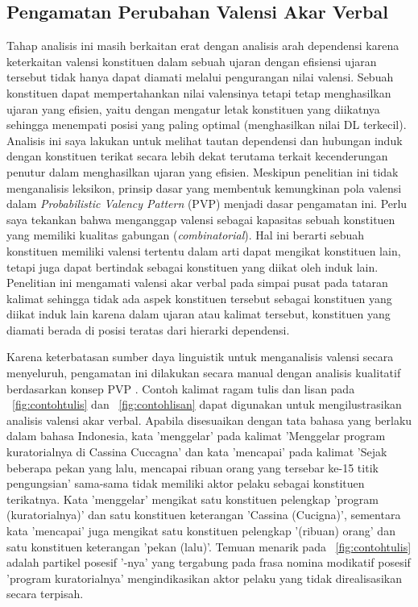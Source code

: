 \subsection{Pengamatan Perubahan Valensi Akar Verbal}
Tahap analisis ini masih berkaitan erat dengan analisis arah dependensi karena keterkaitan valensi konstituen dalam sebuah ujaran dengan efisiensi ujaran tersebut tidak hanya dapat diamati melalui pengurangan nilai valensi. Sebuah konstituen dapat mempertahankan nilai valensinya tetapi tetap menghasilkan ujaran yang efisien, yaitu dengan mengatur letak konstituen yang diikatnya sehingga menempati posisi yang paling optimal (menghasilkan nilai DL terkecil). Analisis ini saya lakukan untuk melihat tautan dependensi dan hubungan induk dengan konstituen terikat secara lebih dekat terutama terkait kecenderungan penutur dalam menghasilkan ujaran yang efisien. Meskipun penelitian ini tidak menganalisis leksikon, prinsip dasar yang membentuk kemungkinan pola valensi dalam \textit{Probabilistic Valency Pattern} (PVP) \citep{liu2006syntactic} menjadi dasar pengamatan ini. Perlu saya tekankan bahwa \cite{liu2006syntactic} menganggap valensi sebagai kapasitas sebuah konstituen yang memiliki kualitas gabungan (\textit{combinatorial}). Hal ini berarti sebuah konstituen memiliki valensi tertentu dalam arti dapat mengikat konstituen lain, tetapi juga dapat bertindak sebagai konstituen yang diikat oleh induk lain. Penelitian ini mengamati valensi akar verbal pada simpai pusat pada tataran kalimat sehingga tidak ada aspek konstituen tersebut sebagai konstituen yang diikat induk lain karena dalam ujaran atau kalimat tersebut, konstituen yang diamati berada di posisi teratas dari hierarki dependensi.

Karena keterbatasan sumber daya linguistik untuk menganalisis valensi secara menyeluruh, pengamatan ini dilakukan secara manual dengan analisis kualitatif berdasarkan konsep PVP \citep{liu2006syntactic}. Contoh kalimat ragam tulis dan lisan pada \pic~\ref{fig:contohtulis} dan \pic~\ref{fig:contohlisan} dapat digunakan untuk mengilustrasikan analisis valensi akar verbal. Apabila disesuaikan dengan tata bahasa yang berlaku dalam bahasa Indonesia, kata 'menggelar' pada kalimat 'Menggelar program kuratorialnya di Cassina Cuccagna' dan kata 'mencapai' pada kalimat 'Sejak beberapa pekan yang lalu, mencapai ribuan orang yang tersebar ke-15 titik pengungsian' sama-sama tidak memiliki aktor pelaku sebagai konstituen terikatnya. Kata 'menggelar' mengikat satu konstituen pelengkap 'program (kuratorialnya)' dan satu konstituen keterangan 'Cassina (Cucigna)', sementara kata 'mencapai' juga mengikat satu konstituen pelengkap '(ribuan) orang' dan satu konstituen keterangan 'pekan (lalu)'. Temuan menarik pada \pic~\ref{fig:contohtulis} adalah partikel posesif '-nya' yang tergabung pada frasa nomina modikatif posesif 'program kuratorialnya' mengindikasikan aktor pelaku yang tidak direalisasikan secara terpisah. 


